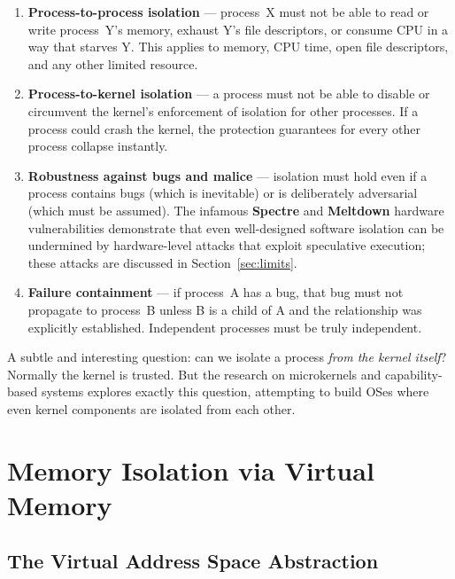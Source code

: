 \documentclass[11pt]{article}
\begin{document}
\begin{enumerate}
    \item \textbf{Process-to-process isolation} --- process~X must not be able to read
          or write process~Y's memory, exhaust Y's file descriptors, or consume CPU in a
          way that starves Y. This applies to memory, CPU time, open file descriptors, and
          any other limited resource.
    \item \textbf{Process-to-kernel isolation} --- a process must not be able to disable
          or circumvent the kernel's enforcement of isolation for other processes. If a
          process could crash the kernel, the protection guarantees for every other process
          collapse instantly.
    \item \textbf{Robustness against bugs and malice} --- isolation must hold even if a
          process contains bugs (which is inevitable) or is deliberately adversarial (which
          must be assumed). The infamous \textbf{Spectre} and \textbf{Meltdown} hardware
          vulnerabilities demonstrate that even well-designed software isolation can be
          undermined by hardware-level attacks that exploit speculative execution; these
          attacks are discussed in Section~\ref{sec:limits}.
    \item \textbf{Failure containment} --- if process~A has a bug, that bug must not
          propagate to process~B unless B is a child of A and the relationship was explicitly
          established. Independent processes must be truly independent.
\end{enumerate}

A subtle and interesting question: can we isolate a process \emph{from the kernel itself}?
Normally the kernel is trusted. But the research on microkernels and capability-based systems
explores exactly this question, attempting to build OSes where even kernel components are
isolated from each other.

\section{Memory Isolation via Virtual Memory}

\subsection{The Virtual Address Space Abstraction}
\end{document}
